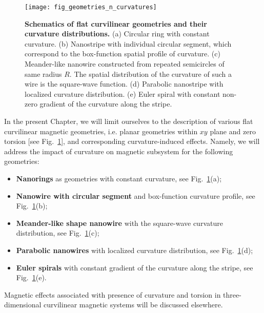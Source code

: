 \begin{figure}[t]
	\texttt{[image: fig\_geometries\_n\_curvatures]}
	\caption{\label{fig:Geometries_n_curvatures}%
		\textbf{Schematics of flat curvilinear geometries and their curvature distributions.} (a) Circular ring with constant curvature. (b) Nanostripe with individual circular segment, which correspond to the box-function spatial profile of curvature. (c) Meander-like nanowire constructed from repeated semicircles of same radius $R$. The spatial distribution of the curvature of such a wire is the square-wave function. (d) Parabolic nanostripe with localized curvature distribution. (e) Euler spiral with constant non-zero gradient of the curvature along the stripe.}
\end{figure}

In the present Chapter, we will limit ourselves to the description of various flat curvilinear magnetic geometries, i.e. planar geometries within $xy$ plane and zero torsion [see Fig.~\ref{fig:Geometries_n_curvatures}], and corresponding curvature-induced effects. Namely, we will address the impact of curvature on magnetic subsystem for the following geometries:
\begin{itemize}
	\item \textbf{Nanorings} as geometries with constant curvature, see Fig.~\ref{fig:Geometries_n_curvatures}(a);
	\item \textbf{Nanowire with circular segment} and box-function curvature profile, see Fig.~\ref{fig:Geometries_n_curvatures}(b);
	\item \textbf{Meander-like shape nanowire} with the square-wave curvature distribution, see Fig.~\ref{fig:Geometries_n_curvatures}(c);
	\item \textbf{Parabolic nanowires} with localized curvature distribution, see Fig.~\ref{fig:Geometries_n_curvatures}(d);
	\item \textbf{Euler spirals} with constant gradient of the curvature along the stripe, see Fig.~\ref{fig:Geometries_n_curvatures}(e).
\end{itemize}
Magnetic effects associated with presence of curvature and torsion in three-dimensional curvilinear magnetic systems will be discussed elsewhere.